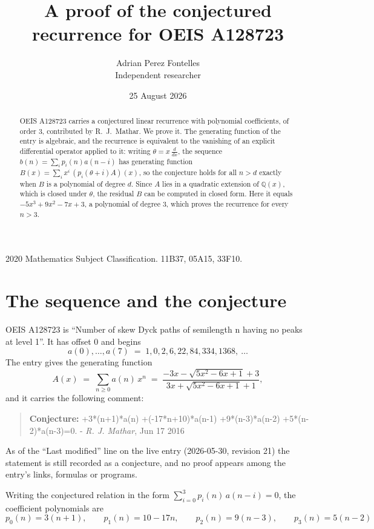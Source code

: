 \documentclass[11pt,a4paper]{article}
\title{A proof of the conjectured recurrence for OEIS A128723}
\author{Adrian Perez Fontelles\\ \small Independent researcher}
\date{25 August 2026}
\theoremstyle{plain}
\theoremstyle{definition}
\begin{document}
\maketitle

\begin{abstract}
OEIS A128723 carries a conjectured linear recurrence with polynomial coefficients, of
order 3, contributed by R.~J.~Mathar. We prove it. The generating function of the
entry is algebraic, and the recurrence is equivalent to the vanishing of an explicit
differential operator applied to it: writing $\theta=x\,\frac{d}{dx}$, the sequence
$b(n)=\sum_{i}p_{i}(n)a(n-i)$ has generating function
$B(x)=\sum_{i}x^{i}\,(p_{i}(\theta+i)A)(x)$, so the conjecture holds for all $n>d$ exactly
when $B$ is a polynomial of degree $d$. Since $A$ lies in a quadratic extension of
$\mathbb{Q}(x)$, which is closed under $\theta$, the residual $B$ can be computed in
closed form. Here it equals $- 5 x^{3} + 9 x^{2} - 7 x + 3$, a polynomial of degree $3$, which proves
the recurrence for every $n>3$.
\end{abstract}

\noindent\small 2020 Mathematics Subject Classification. 11B37, 05A15, 33F10.\normalsize

\section{The sequence and the conjecture}

OEIS A128723 is ``Number of skew Dyck paths of semilength n having no peaks at level 1''. It has offset $0$ and begins
\[
a(0),\dots,a(7)\;=\;1, 0, 2, 6, 22, 84, 334, 1368,\ \dots
\]
The entry gives the generating function
\begin{equation}\label{eq:gf}
A(x)\;=\;\sum_{n\ge 0} a(n)\,x^{n}\;=\;\frac{- 3 x - \sqrt{5 x^{2} - 6 x + 1} + 3}{3 x + \sqrt{5 x^{2} - 6 x + 1} + 1} ,
\end{equation}
and it carries the following comment:
\begin{quote}\small
\textbf{Conjecture:} +3*(n+1)*a(n) +(-17*n+10)*a(n-1) +9*(n-3)*a(n-2) +5*(n-2)*a(n-3)=0. - \emph{R. J. Mathar}, Jun 17 2016
\end{quote}
As of the ``Last modified'' line on the live entry (2026-05-30, revision 21) the
statement is still recorded as a conjecture, and no proof appears among the entry's links,
formulas or programs.

Writing the conjectured relation in the form $\sum_{i=0}^{3}p_{i}(n)\,a(n-i)=0$,
the coefficient polynomials are
\[
p_{0}(n)=3 \left(n + 1\right),\qquad p_{1}(n)=10 - 17 n,\qquad p_{2}(n)=9 \left(n - 3\right),\qquad p_{3}(n)=5 \left(n - 2\right)
\]
\end{document}
